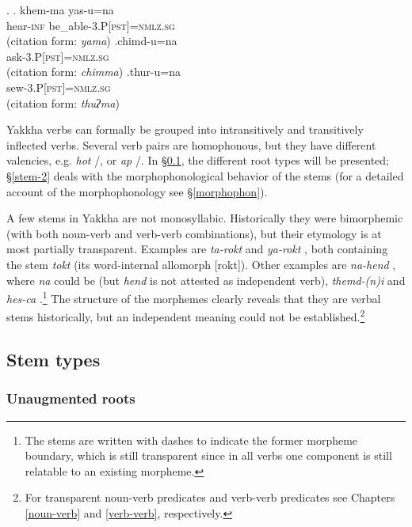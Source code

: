 \ex. \ag. khem-ma yas-u=na\\
 hear{\scshape -inf} be\_able{\scshape -3.P[pst]=nmlz.sg}\\
 (citation form: \emph{yama})
\bg.chimd-u=na\\
ask{\scshape -3.P[pst]=nmlz.sg}\\
 (citation form: \emph{chimma})
\bg.thur-u=na\\
sew{\scshape -3.P[pst]=nmlz.sg}\\
 (citation form: \emph{thuʔma})


Yakkha verbs can  formally  be grouped into intransitively and transitively inflected verbs. Several verb pairs are homophonous, but they have different valencies, e.g. \emph{hot} /, or \emph{ap}   /. In §\ref{stem-1}, the different root types will be presented; §\ref{stem-2} deals with the morphophonological behavior of the stems (for a detailed account of the morphophonology see §\ref{morphophon}).

A few stems in Yakkha are not monosyllabic. Historically they were bimorphemic (with both noun-verb and verb-verb combinations), but their etymology is at most partially transparent. Examples are \emph{ta-rokt}  and \emph{ya-rokt} , both containing the stem \emph{tokt}  (its word-internal allomorph [rokt]). Other examples are  \emph{na-hend} , where \emph{na} could be  (but \emph{hend} is not attested as independent verb), \emph{themd-(n)i}  and \emph{hes-ca} .\footnote{The stems are written with dashes to indicate the former morpheme boundary, which is still transparent since in all verbs one component is still relatable to an existing  morpheme.} The structure of the morphemes clearly reveals that they are verbal stems historically, but an independent  meaning could not be established.\footnote{For transparent noun-verb predicates and verb-verb predicates see Chapters \ref{noun-verb} and \ref{verb-verb}, respectively.}

\subsection{Stem types}\label{stem-1}
\subsubsection{Unaugmented roots}\label{unaugmented}

